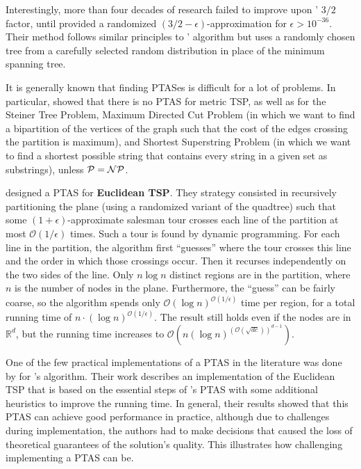 Interestingly, more than four decades of research failed to improve upon \citeauthor{Christofides2022WorstCaseAO}' \(3/2\) factor, until \cite{slightlyBetterApxTSP} provided a randomized \((3/2 - \epsilon)\)-approximation for \(\epsilon > 10^{-36}\). Their method follows similar principles to \citeauthor{Christofides2022WorstCaseAO}' algorithm but uses a randomly chosen tree from a carefully selected random distribution in place of the minimum spanning tree.

It is generally known that finding PTASes is difficult for a lot of problems. In particular, \cite{noPTASMetricTSP} showed that there is no PTAS for metric TSP, as well as for the Steiner Tree Problem, Maximum Directed Cut Problem (in which we want to find a bipartition of the vertices of the graph such that the cost of the edges crossing the partition is maximum), and Shortest Superstring Problem (in which we want to find a shortest possible string that contains every string in a given set as substrings), unless \(\mathcal{P} = \mathcal{NP}\).

\cite{PTASeuclidianTSP} designed a PTAS for \textbf{Euclidean TSP}. They strategy consisted in recursively partitioning the plane (using a randomized variant of the quadtree) such that some \((1 + \epsilon)\)-approximate salesman tour crosses each line of the partition at most \(\mathcal{O}(1/\epsilon)\) times. Such a tour is found by dynamic programming. For each line in the partition, the algorithm first ``guesses'' where the tour crosses this line and the order in which those crossings occur. Then it recurses independently on the two sides of the line. Only \(n \log{n}\) distinct regions are in the partition, where \(n\) is the number of nodes in the plane. Furthermore, the “guess” can be fairly coarse, so the algorithm spends only \(\mathcal{O}(\log{n})^{\mathcal{O}(1/\epsilon)}\) time per region, for a total running time of \(n \cdot (\log{n})^{\mathcal{O}(1/\epsilon)}\). The result still holds even if the nodes are in \(\mathbb{R}^d\), but the running time increases to \(\mathcal{O}(n (\log{n})^{(\mathcal{O}(\sqrt{dc}))^{d-1}})\).

One of the few practical implementations of a PTAS in the literature was done by \cite{implementationPTASeuclidianTSP} for \citeauthor{PTASeuclidianTSP}'s algorithm. Their work describes an implementation of the Euclidean TSP that is based on the essential steps of \citeauthor{PTASeuclidianTSP}'s PTAS with some additional heuristics to improve the running time. In general, their results showed that this PTAS can achieve good performance in practice, although due to challenges during implementation, the authors had to make decisions that caused the loss of theoretical guarantees of the solution's quality. This illustrates how challenging implementing a PTAS can be.

